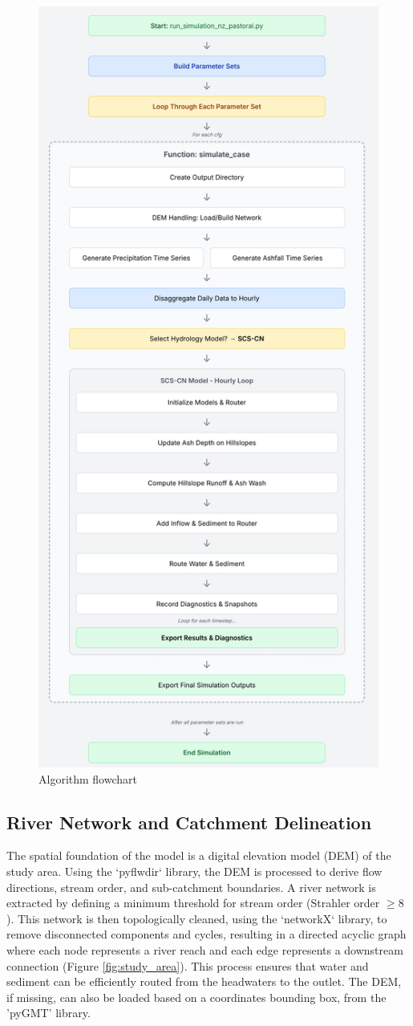 \documentclass[12pt, a4paper]{article}
\begin{document}
\begin{figure}[H]
  \centering
  \includegraphics[width=0.5\linewidth,height=0.7\textheight]{diagram.png}
  \caption{Algorithm flowchart}
  \label{fig:flowchart}
\end{figure}


\subsection{River Network and Catchment Delineation}
The spatial foundation of the model is a digital elevation model (DEM) of the study area. Using the `pyflwdir` library, the DEM is processed to derive flow directions, stream order, and sub-catchment boundaries. A river network is extracted by defining a minimum threshold for stream order (Strahler order $\ge 8$). This network is then topologically cleaned, using the `networkX` library, to remove disconnected components and cycles, resulting in a directed acyclic graph where each node represents a river reach and each edge represents a downstream connection (Figure \ref{fig:study_area}). This process ensures that water and sediment can be efficiently routed from the headwaters to the outlet. The DEM, if missing, can also be loaded based on a coordinates bounding box, from the 'pyGMT' library.
\end{document}
